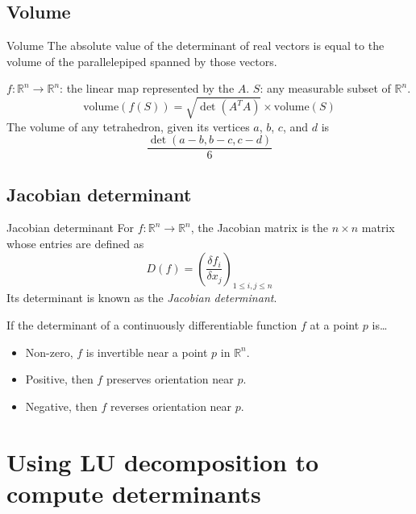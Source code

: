\documentclass{beamer}
\begin{document}
\subsection{Volume}

\begin{frame}{Volume}
    The absolute value of the determinant of real vectors is equal to the volume
    of the parallelepiped spanned by those vectors.

    $f : \mathbb{R}^n \to \mathbb{R}^n$: the linear map represented by the $A$.
    $S$: any measurable subset of $\mathbb{R}^n$.
    \[
        \text{volume}(f(S)) = \sqrt{\det{({A^T}A)}} \times \text{volume}(S)
    \]
    The volume of any tetrahedron, given its vertices $a$, $b$, $c$, and $d$ is
    \[
        \frac{\det(a - b, b - c, c - d)}{6}
    \]
\end{frame}

\subsection{Jacobian determinant}

\begin{frame}{Jacobian determinant}
    For $f : \mathbb{R}^n \to \mathbb{R}^n$,
    the Jacobian matrix is the $n \times n$ matrix whose entries are defined as
    \[
        D(f) = {\left( \frac{\delta f_i}{\delta x_j} \right)}_{1 \leq i, j \leq n}
    \]
    Its determinant is known as the \emph{Jacobian determinant}.

    \begin{exampleblock}{}
        If the determinant of a continuously differentiable function $f$ at a point $p$ is\dots
        \begin{itemize}
            \item Non-zero, $f$ is invertible near a point $p$ in $\mathbb{R}^n$.
            \item Positive, then $f$ preserves orientation near $p$.
            \item Negative, then $f$ reverses orientation near $p$.
        \end{itemize}
    \end{exampleblock}

\end{frame}

\section{Using LU decomposition to compute determinants}
\end{document}
